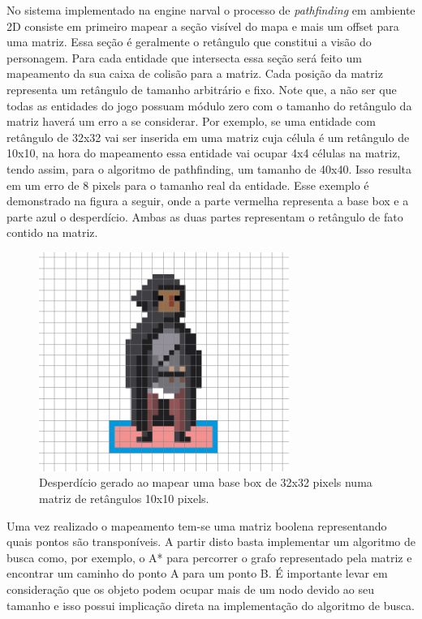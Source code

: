 \documentclass[12pt, 
openright, 
oneside, 
a4paper,    
brazil]{facom-ufu-abntex2}
\begin{document}
No sistema implementado na engine narval o processo de \textit{pathfinding} em ambiente 2D consiste em primeiro mapear a seção visível do mapa e mais um offset para uma matriz. Essa seção é geralmente o retângulo que constitui a visão do personagem. Para cada entidade que intersecta essa seção será feito um mapeamento da sua caixa de colisão para a matriz. Cada posição da matriz representa um retângulo de tamanho arbitrário e fixo. Note que, a não ser que todas as entidades do jogo possuam módulo zero com o tamanho do retângulo da matriz haverá um erro a se considerar. Por exemplo, se uma entidade com retângulo de 32x32 vai ser inserida em uma matriz cuja célula é um retângulo de 10x10, na hora do mapeamento essa entidade vai ocupar 4x4 células na matriz, tendo assim, para o algoritmo de pathfinding, um tamanho de 40x40. Isso resulta em um erro de 8 pixels para o tamanho real da entidade. Esse exemplo é demonstrado na figura a seguir, onde a parte vermelha representa a base box e a parte azul o desperdício. Ambas as duas partes representam o retângulo de fato contido na matriz.

\begin{figure}[H]
	\centering
	\includegraphics[width=22em]{imagens/pixelWaste.png}
	\caption{Desperdício gerado ao mapear uma base box de 32x32 pixels numa matriz de retângulos 10x10 pixels.}
\end{figure}


Uma vez realizado o mapeamento tem-se uma matriz boolena representando quais pontos são transponíveis. A partir disto basta implementar um algoritmo de busca como, por exemplo, o A* para percorrer o grafo representado pela matriz e encontrar um caminho do ponto A para um ponto B. É importante levar em consideração que os objeto podem ocupar mais de um nodo devido ao seu tamanho e isso possui implicação direta na implementação do algoritmo de busca.
\end{document}
